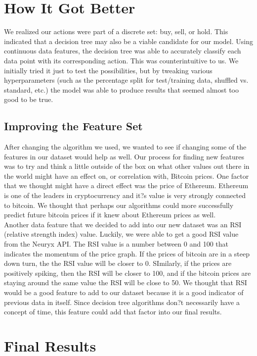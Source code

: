 \documentclass{article}
\begin{document}
\section{ How It Got Better }

We realized our actions were part of a discrete set: buy, sell, or hold. This indicated that a decision tree may also be a viable candidate for our model. Using continuous data features, the decision tree was able to accurately classify each data point with its corresponding action. This was counterintuitive to us. We initially tried it just to test the possibilities, but by tweaking various hyperparameters (such as the percentage split for test/training data, shuffled vs. standard, etc.) the model was able to produce results that seemed almost too good to be true. 

\subsection{ Improving the Feature Set }
After changing the algorithm we used, we wanted to see if changing some of the features in our dataset would help as well. Our process for finding new features was to try and think a little outside of the box on what other values out there in the world might have an effect on, or correlation with, Bitcoin prices. One factor that we thought might have a direct effect was the price of Ethereum. Ethereum is one of the leaders in cryptocurrency and it?s value is very strongly connected to bitcoin. We thought that perhaps our algorithms could more successfully predict future bitcoin prices if it knew about Ethereum prices as well. \\
Another data feature that we decided to add into our new dataset was an RSI (relative strength index) value. Luckily, we were able to get a good RSI value from the Neuryx API. The RSI value is a number between 0 and 100 that indicates the momentum of the price graph. If the prices of bitcoin are in a steep down turn, the the RSI value will be closer to 0. SImilarly, if the prices are positively spiking, then the RSI will be closer to 100, and if the bitcoin prices are staying around the same value the RSI will be close to 50. We thought that RSI would be a good feature to add to our dataset because it is a good indicator of previous data in itself. Since decision tree algorithms don?t necessarily have a concept of time, this feature could add that factor into our final results. 


\section{ Final Results }
\end{document}

